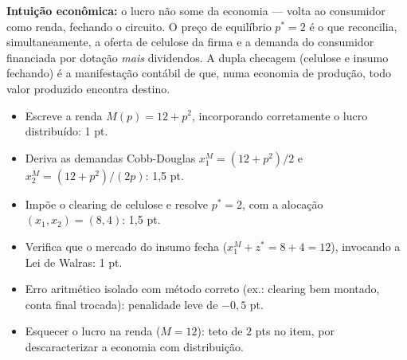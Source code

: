 \begin{solucao}
\textbf{Intuição econômica:} o lucro não some da economia --- volta ao consumidor como renda, fechando o circuito. O preço de equilíbrio $p^{*}=2$ é o que reconcilia, simultaneamente, a oferta de celulose da firma e a demanda do consumidor financiada por dotação \emph{mais} dividendos. A dupla checagem (celulose e insumo fechando) é a manifestação contábil de que, numa economia de produção, todo valor produzido encontra destino.
\rubricalabel
\begin{itemize}
\item Escreve a renda $M(p)=12+p^{2}$, incorporando corretamente o lucro distribuído: 1 pt.
\item Deriva as demandas Cobb-Douglas $x_1^{M}=(12+p^{2})/2$ e $x_2^{M}=(12+p^{2})/(2p)$: 1{,}5 pt.
\item Impõe o clearing de celulose e resolve $p^{*}=2$, com a alocação $(x_1,x_2)=(8,4)$: 1{,}5 pt.
\item Verifica que o mercado do insumo fecha ($x_1^{M}+z^{*}=8+4=12$), invocando a Lei de Walras: 1 pt.
\item Erro aritmético isolado com método correto (ex.: clearing bem montado, conta final trocada): penalidade leve de $-0{,}5$ pt.
\item Esquecer o lucro na renda ($M=12$): teto de $2$ pts no item, por descaracterizar a economia com distribuição.
\end{itemize}
\end{solucao}

